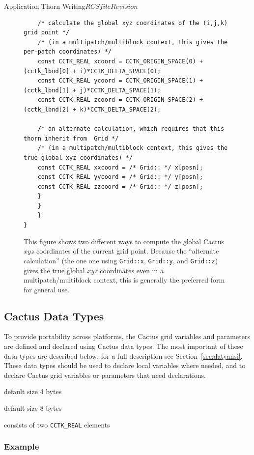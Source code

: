 \begin{cactuspart}{Application Thorn Writing}{$RCSfile$}{$Revision$}
\begin{figure}[bp]
\begin{verbatim}
    /* calculate the global xyz coordinates of the (i,j,k) grid point */
    /* (in a multipatch/multiblock context, this gives the per-patch coordinates) */
    const CCTK_REAL xcoord = CCTK_ORIGIN_SPACE(0) + (cctk_lbnd[0] + i)*CCTK_DELTA_SPACE(0);
    const CCTK_REAL ycoord = CCTK_ORIGIN_SPACE(1) + (cctk_lbnd[1] + j)*CCTK_DELTA_SPACE(1);
    const CCTK_REAL zcoord = CCTK_ORIGIN_SPACE(2) + (cctk_lbnd[2] + k)*CCTK_DELTA_SPACE(2);

    /* an alternate calculation, which requires that this thorn inherit from  Grid */
    /* (in a multipatch/multiblock context, this gives the true global xyz coordinates) */
    const CCTK_REAL xxcoord = /* Grid:: */ x[posn];
    const CCTK_REAL yycoord = /* Grid:: */ y[posn];
    const CCTK_REAL zzcoord = /* Grid:: */ z[posn];
    }
    }
    }
}
\end{verbatim}
\caption{%
	This figure shows two different ways to compute the global
	Cactus $xyz$ coordinates of the current grid point.  Because
	the ``alternate calculation'' (the one one using \texttt{Grid::x},
	\texttt{Grid::y}, and \texttt{Grid::z}) gives the true global
	$xyz$ coordinates even in a multipatch/multiblock context,
	this is generally the preferred form for general use.
	}
\label{fig-global-xyz-coords}
\end{figure}

\subsection{Cactus Data Types}

To provide portability across platforms, the Cactus grid variables and parameters are defined and
declared using Cactus data types. The most important of
these data types are described below, for a full description
see Section~\ref{sec:datyansi}. These data types should
be used to declare local variables where needed, and to
declare Cactus grid variables or parameters that need
declarations.

\begin{Lentry}

\item[\texttt{CCTK\_INT}] default size 4 bytes
\item[\texttt{CCTK\_REAL}] default size 8 bytes
\item[\texttt{CCTK\_COMPLEX}] consists of two \texttt{CCTK\_REAL} elements

\end{Lentry}

\subsubsection{Example}


\end{cactuspart}
